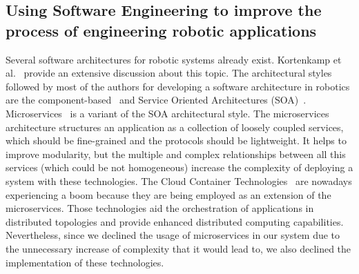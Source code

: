 \subsection{Using Software Engineering to improve the process of engineering robotic applications}


Several software architectures for robotic systems already exist. 
Kortenkamp et al.~\cite{Kortenkamp2008} provide an extensive discussion about this topic. 
The architectural styles followed by most of the authors for developing a software architecture in robotics are the component-based~\cite{Bruyninckx2013,Brugali2012,braberman} and Service Oriented Architectures (SOA)~\cite{Fluckiger2014}.
Microservices~\cite{Newman2015} is a variant of the SOA architectural style. 
The microservices architecture structures an application as a collection of loosely coupled services, which should be fine-grained and the protocols should be lightweight. 
It helps to improve modularity, but the multiple and complex relationships between all this services (which could be not homogeneous) increase the complexity of deploying a system with these technologies. 
The Cloud Container Technologies~\cite{Pahl2017} are nowadays experiencing a boom because they are being employed as an extension of the microservices. 
Those technologies aid the orchestration of applications in distributed topologies and provide enhanced distributed computing capabilities. %
Nevertheless, since we declined the usage of microservices in our system due to the unnecessary increase of complexity that it would lead to, we also declined the implementation of these technologies. 

